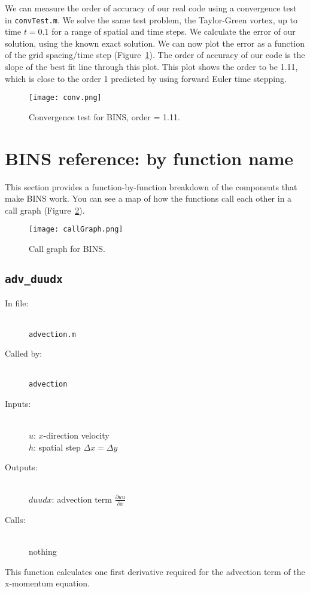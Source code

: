 \documentclass[12pt]{article}
\begin{document}
We can measure the order of accuracy of our real code using a convergence test in \texttt{convTest.m}.  We solve the same test problem, the Taylor-Green vortex, up to time $t=0.1$ for a range of spatial and time steps.  We calculate the error of our solution, using the known exact solution.  We can now plot the error as a function of the grid spacing/time step (Figure~\ref{conv}).  The order of accuracy of our code is the slope of the best fit line through this plot.  This plot shows the order to be 1.11, which is close to the order 1 predicted by using forward Euler time stepping.

\begin{figure}
\center
\texttt{[image: conv.png]} 
\caption{Convergence test for BINS, order = 1.11.}
\label{conv}
\end{figure}


\FloatBarrier
\section{BINS reference: by function name}
This section provides a function-by-function breakdown of the components that make BINS work.  You can see a map of how the functions call each other in a call graph (Figure~\ref{callGraph}).

\begin{figure}
\center
\texttt{[image: callGraph.png]} 
\caption{Call graph for BINS.}
\label{callGraph}
\end{figure}

\subsection{\texttt{adv\_duudx}}
\begin{description}
\item[In file:] \hfill \\ \texttt{advection.m}
\item[Called by:] \hfill \\ \texttt{advection}
\item[Inputs:] \hfill \\ $u$: $x$-direction velocity \\ $h$: spatial step $\Delta x = \Delta y$
\item[Outputs:] \hfill \\ $duudx$: advection term $\frac{\partial uu}{\partial x}$
\item[Calls:] \hfill \\ nothing
\end{description}
This function calculates one first derivative required for the advection term of the x-momentum equation.
\end{document}
